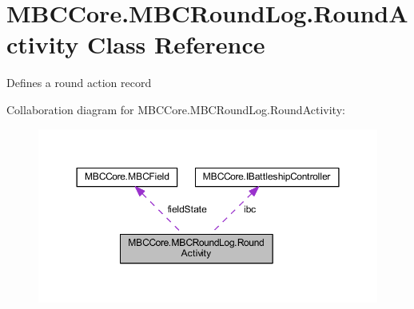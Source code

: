 \hypertarget{class_m_b_c_core_1_1_m_b_c_round_log_1_1_round_activity}{\section{M\-B\-C\-Core.\-M\-B\-C\-Round\-Log.\-Round\-Activity Class Reference}
\label{class_m_b_c_core_1_1_m_b_c_round_log_1_1_round_activity}
}


Defines a round action record 




Collaboration diagram for M\-B\-C\-Core.\-M\-B\-C\-Round\-Log.\-Round\-Activity\-:\nopagebreak
\begin{figure}[H]
\begin{center}
\leavevmode
\includegraphics[width=350pt]{class_m_b_c_core_1_1_m_b_c_round_log_1_1_round_activity__coll__graph}
\end{center}
\end{figure}
